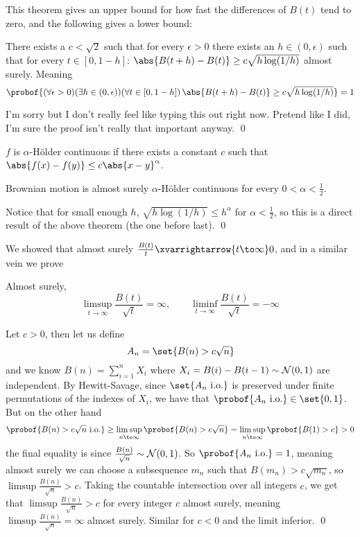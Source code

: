 This theorem gives an upper bound for how fast the differences of $B(t)$ tend to zero, and the following gives a lower bound:

\bthrm

    There exists a $c<\sqrt2$ such that for every $\epsilon>0$ there exists an $h\in(0,\epsilon)$ such that for every $t\in[0,1-h]$: $\abs{B(t+h)-B(t)}\geq c\sqrt{h\log(1/h)}$ almost surely.
    Meaning
    $$ \probof{(\forall\epsilon>0)(\exists h\in(0,\epsilon))(\forall t\in[0,1-h])\,\abs{B(t+h)-B(t)}\geq c\sqrt{h\log(1/h)}} = 1 $$

\ethrm

I'm sorry but I don't really feel like typing this out right now.
Pretend like I did, I'm sure the proof isn't really that important anyway.
\qed

\bdefn

    $f$ is {\emphcolor $\alpha$-H\"older continuous} if there exists a constant $c$ such that $\abs{f(x)-f(y)}\leq c\abs{x-y}^\alpha$.

\edefn

\bcoro

    Brownian motion is almost surely $\alpha$-H\"older continuous for every $0<\alpha<\frac12$.

\ecoro

Notice that for small enough $h$, $\sqrt{h\log(1/h)}\leq h^\alpha$ for $\alpha<\frac12$, so this is a direct result of the above theorem (the one before last).
\qed

We showed that almost surely $\frac{B(t)}t\xvarrightarrow{t\to\infty}0$, and in a similar vein we prove

\bprop

    Almost surely,
    $$ \limsup_{t\to\infty}\frac{B(t)}{\sqrt t}=\infty,\qquad \liminf_{t\to\infty}\frac{B(t)}{\sqrt t}=-\infty $$

\eprop

Let $c>0$, then let us define
$$ A_n = \set{B(n) > c\sqrt n} $$
and we know $B(n)=\sum_{i=1}^nX_i$ where $X_i=B(i)-B(i-1)\sim{\cal N}(0,1)$ are independent.
By Hewitt-Savage, since $\set{A_n\hbox{ i.o.}}$ is preserved under finite permutations of the indexes of $X_i$, we have that $\probof{A_n\hbox{ i.o.}}\in\set{0,1}$.
But on the other hand
$$ \probof{B(n)>c\sqrt n\hbox{ i.o.}} \geq \limsup_{n\to\infty}\probof{B(n)>c\sqrt n} = \limsup_{n\to\infty}\probof{B(1)>c} > 0 $$
the final equality is since $\frac{B(n)}{\sqrt n}\sim{\cal N}(0,1)$.
So $\probof{A_n\hbox{ i.o.}}=1$, meaning almost surely we can choose a subsequence $m_n$ such that $B(m_n)>c\sqrt{m_n}$, so $\limsup\frac{B(n)}{\sqrt n}>c$.
Taking the countable intersection over all integers $c$, we get that $\limsup\frac{B(n)}{\sqrt n}>c$ for every integer $c$ almost surely, meaning  $\limsup\frac{B(n)}{\sqrt n}=\infty$ almost surely.
Similar for $c<0$ and the limit inferior.
\qed

